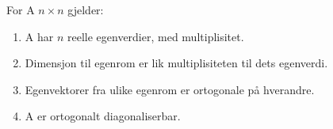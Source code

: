 For A $n\times n$ gjelder:
\begin{enumerate}
  \item A har $n$ reelle egenverdier, med multiplisitet.
  \item Dimensjon til egenrom er lik multiplisiteten til dets egenverdi.
  \item Egenvektorer fra ulike egenrom er ortogonale på hverandre.
  \item A er ortogonalt diagonaliserbar.
\end{enumerate}
